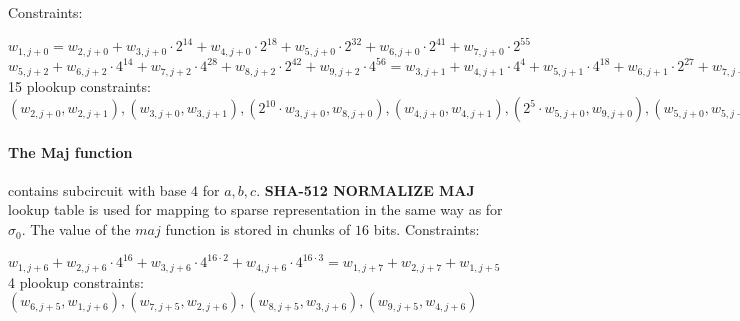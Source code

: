 Constraints:
\begin{center}
    $w_{1, j + 0} = w_{2, j + 0} + w_{3, j + 0} \cdot 2^{14} + w_{4, j + 0} \cdot 2^{18} + w_{5, j + 0} \cdot 2^{32} + w_{6, j + 0} \cdot 2^{41} + w_{7,  j + 0}\cdot 2^{55}$ \\
    $w_{5, j + 2} + w_{6, j + 2} \cdot 4^{14} + w_{7, j + 2} \cdot 4^{28} + w_{8, j + 2} \cdot 2^{42} + w_{9, j + 2} \cdot 4^{56} = w_{3, j + 1} + w_{4, j + 1} \cdot 4^4 + w_{5, j + 1} \cdot 4^{18} + w_{6, j + 1} \cdot 2^{27} + w_{7, j + 1} \cdot 4^{41} + w_{2, j + 1} \cdot 4^{50} + 
     w_{4, j + 1} + w_{5, j + 1} \cdot 4^{14} + w_{6, j + 1} \cdot 4^{23} + w_{7, j + 1} \cdot 2^{37} + w_{2, j + 1} \cdot 4^{46} + w_{4, j + 1} \cdot 4^{60} +
     w_{6, j + 1} + w_{7, j + 1} \cdot 4^{14} + w_{2, j + 1} \cdot 4^{23} + w_{3, j + 1} \cdot 2^{37} + w_{4, j + 1} \cdot 4^{41} + w_{5, j + 1} \cdot 4^{55}$ \\
    15 plookup constraints: $(w_{2, j + 0}, w_{2, j + 1}), (w_{3, j + 0}, w_{3, j + 1}), ( 2^{10} \cdot w_{3, j + 0}, w_{8, j + 0}), (w_{4, j + 0}, w_{4, j + 1}), (2^5 \cdot w_{5, j + 0}, w_{9, j + 0}), (w_{5, j + 0}, w_{5, j + 1}), (w_{6, j + 0}, w_{6, j + 1}), (2^3 \cdot w_{7, j + 0}, w_{8, j + 1}), (w_{7, j + 0}, w_{7, j + 1}), (w_{5, j + 3}, w_{5, j + 2}), (w_{6, j + 3}, w_{6, j + 2}), (w_{7, j + 3}, w_{7, j + 2}), (w_{8, j + 3}, w_{8, j + 2}), (w_{9, j + 3}, w_{9, j + 2}), (2^6 \cdot w_{9, j + 3}, w_{4, j + 2})$
\end{center}

\paragraph{The Maj function}
contains subcircuit with base $4$ for $a, b ,c$.
\textbf{SHA-512 NORMALIZE MAJ} lookup table is used for mapping to sparse representation in the same way as for $\sigma_0$.
The value of the $ maj $ function is stored in chunks of $16$ bits.
Constraints:
\begin{center}
    $w_{1, j + 6} + w_{2, j + 6} \cdot 4^{16} + w_{3, j + 6} \cdot 4^{16 \cdot 2} + w_{4, j + 6} \cdot 4^{16 \cdot 3} = w_{1, j + 7} + w_{2, j + 7} + w_{1, j + 5} $ \\
    4 plookup constraints: $( w_{6, j + 5}, w_{1, j + 6}), ( w_{7, j + 5}, w_{2, j + 6}), (w_{8, j + 5}, w_{3, j + 6}), (w_{9, j + 5}, w_{4, j + 6})$ \\
\end{center}

